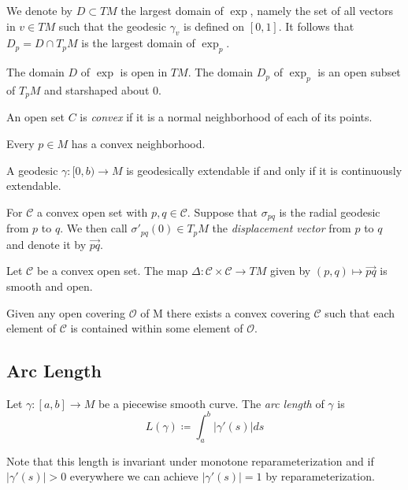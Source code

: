 We denote by $D\subset TM$ the largest domain of $\exp$, namely the set of all vectors in $v\in TM$ such that the geodesic $\gamma_v$ is defined on $[0,1]$. It follows that $D_p = D \cap T_pM$ is the largest domain of $\exp_p$.
\begin{corollary}
The domain $D$ of $\exp$ is open in $TM$. The domain $D_p$ of $\exp_p$ is an open subset of $T_pM$ and starshaped about 0.
\end{corollary}

\begin{definition}
An open set $C$ is \emph{convex} if it is a normal neighborhood of each of its points.
\end{definition}

\begin{proposition}
Every $p\in M$ has a convex neighborhood.
\end{proposition}

\begin{lemma}
A geodesic $\gamma:[0,b)\to M$ is geodesically extendable if and only if it is continuously extendable.
\end{lemma}

For $\mathcal{C}$ a convex open set with $p,q\in \mathcal{C}$. Suppose that $\sigma_{pq}$ is the radial geodesic from $p$ to $q$. We then call $\sigma'_{pq}(0) \in T_pM$ the \emph{displacement vector} from $p$ to $q$ and denote it by $\overrightarrow{pq}$.
\begin{lemma}\label{lem:deltasmooth}
Let $\mathcal{C}$ be a convex open set. The map $\Delta:\mathcal{C}\times\mathcal{C}\to TM$ given by $(p,q)\mapsto \overrightarrow{pq}$ is smooth and open.
\end{lemma}

\begin{lemma}
Given any open covering $\mathcal{O}$ of M there exists a convex covering $\mathcal{C}$ such that each element of $\mathcal{C}$ is contained within some element of $\mathcal{O}$.
\end{lemma}

\subsection{Arc Length}
\begin{definition}
Let $\gamma:[a,b]\to M$ be a piecewise smooth curve. The \emph{arc length} of $\gamma$ is 
\[
L(\gamma)\coloneqq\int_a^b\vert\gamma'(s)\vert ds
\]
\end{definition}
Note that this length is invariant under monotone reparameterization and if $\vert\gamma'(s)\vert > 0$ everywhere we can achieve $\vert\gamma'(s)\vert = 1$ by reparameterization.

